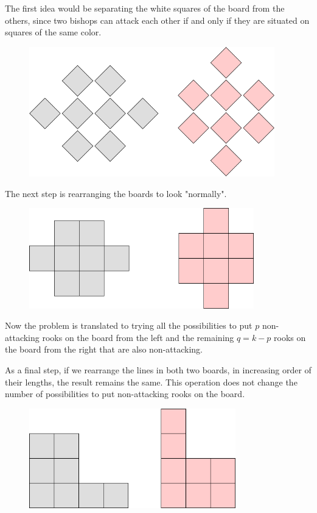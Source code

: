 \documentclass[letterpaper]{article}
\begin{document}
The first idea would be separating the white squares of the board from the others, since two bishops can attack each other if and only if they are situated on squares of the same color.

\begin{figure} [h!]
\centering
\includegraphics[width=0.95\textwidth]{pngOfDiagrams/dpchessboardseparation1.png}
\end{figure}

The next step is rearranging the boards to look "normally".

\newpage

\begin{figure} [h!]
\centering
\includegraphics[width=0.87\textwidth]{pngOfDiagrams/dpchessboardseparation2.png}
\end{figure}

Now the problem is translated to trying all the possibilities to put $p$ non-attacking rooks on the board from the left and the remaining $q = k - p$ rooks on the board from the right that are also non-attacking.

As a final step, if we rearrange the lines in both two boards, in increasing order of their lengths, the result remains the same. This operation does not change the number of possibilities to put non-attacking rooks on the board.

\begin{figure} [h!]
\centering
\includegraphics[width=0.80\textwidth]{pngOfDiagrams/dpchessboardseparation3.png}
\end{figure}
\end{document}
